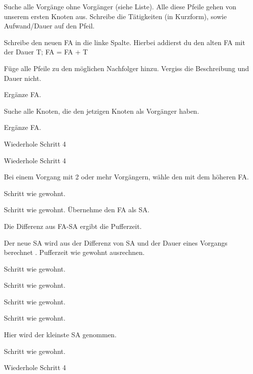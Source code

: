 \documentclass{beamer}
\begin{document}
\begin{frame}[t,shrink=65]
\begin{itemize}
{    \item<only@+> {Suche alle Vorgänge ohne Vorgänger (siehe Liste). Alle diese Pfeile gehen von unserem ersten Knoten aus. Schreibe die Tätigkeiten (in Kurzform), sowie Aufwand/Dauer auf den Pfeil.}
    \item<only@+> {Schreibe den neuen FA in die linke Spalte. Hierbei addierst du den alten FA mit der Dauer T;
                   FA = FA + T}
    \item<only@+> {Füge alle Pfeile zu den möglichen Nachfolger hinzu. Vergiss die Beschreibung und Dauer nicht.}
    \item<only@+> {Ergänze FA.}
    \item<only@+> {Suche alle Knoten, die den jetzigen Knoten als Vorgänger haben.}
    \item<only@+> {Ergänze FA.}
    \item<only@+> {Wiederhole Schritt 4}
    \item<only@+> {Wiederhole Schritt 4}
    \item<only@+> {Bei einem Vorgang mit 2 oder mehr Vorgängern, wähle den mit dem höheren FA.}
    \item<only@+> {Schritt wie gewohnt.}
    \item<only@+> {Schritt wie gewohnt. Übernehme den FA als SA.}
    \item<only@+> {Die Differenz aus FA-SA ergibt die Pufferzeit.}
    \item<only@+> {Der neue SA wird aus der Differenz von SA und der Dauer eines Vorgangs berechnet . Pufferzeit wie gewohnt ausrechnen.}
    \item<only@+> {Schritt wie gewohnt.}
    \item<only@+> {Schritt wie gewohnt.}
    \item<only@+> {Schritt wie gewohnt.}
    \item<only@+> {Schritt wie gewohnt.}
    \item<only@+> {Hier wird der kleinste SA genommen.}
    \item<only@+> {Schritt wie gewohnt.}
    \item<only@+> {Wiederhole Schritt 4}
    \item \alert<+> {}
}

\end{itemize}

\end{frame}
\end{document}
